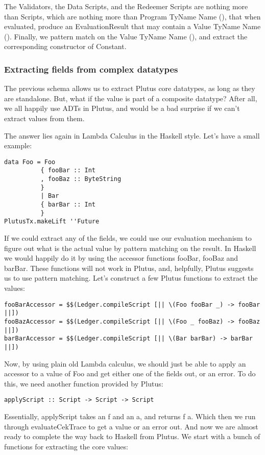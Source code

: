 \documentclass{article}
\begin{document}
The Validators, the Data Scripts, and the Redeemer Scripts are nothing more than Scripts, which are nothing more than Program TyName Name (), that when evaluated, produce an EvaluationResult that may contain a Value TyName Name (). Finally, we pattern match on the Value TyName Name (), and extract the corresponding constructor of Constant.

\subsubsection{Extracting fields from complex datatypes}
The previous schema allows us to extract Plutus core datatypes, as long as they are standalone. But, what if the value is part of a composite datatype? After all, we all happily use ADTs in Plutus, and would be a bad surprise if we can't extract values from them.

The answer lies again in Lambda Calculus in the Haskell style. Let's have a small example:
\begin{verbatim}
data Foo = Foo
          { fooBar :: Int
          , fooBaz :: ByteString
          }
          | Bar
          { barBar :: Int
          }
PlutusTx.makeLift ''Future
\end{verbatim}
If we could extract any of the fields, we could use our evaluation mechanism to figure out what is the actual value by pattern matching on the result. In Haskell we would happily do it by using the accessor functions fooBar, fooBaz and barBar. These functions will not work in Plutus, and, helpfully, Plutus suggests us to use pattern matching. Let's construct a few Plutus functions to extract the values:
\begin{verbatim}
fooBarAccessor = $$(Ledger.compileScript [|| \(Foo fooBar _) -> fooBar ||]) 
fooBazAccessor = $$(Ledger.compileScript [|| \(Foo _ fooBaz) -> fooBaz ||]) 
barBarAccessor = $$(Ledger.compileScript [|| \(Bar barBar) -> barBar ||])
\end{verbatim}

Now, by using plain old Lambda calculus, we should just be able to apply an accessor to a value of Foo and get either one of the fields out, or an error. To do this, we need another function provided by Plutus:

\begin{verbatim}
applyScript :: Script -> Script -> Script
\end{verbatim}

Essentially, applyScript takes an f and an a, and returns f a. Which then we run through evaluateCekTrace to get a value or an error out. And now we are almost ready to complete the way back to Haskell from Plutus. We start with a bunch of functions for extracting the core values:
\end{document}
